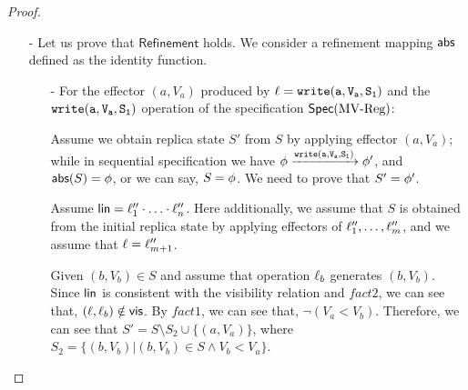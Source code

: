 \begin {proof}
\begin{itemize}
    \begin{itemize}
    \setlength{\itemsep}{0.5pt}
    \item[-] $(V < V_1) \vee (V < V_2)$,

    \item[-] $(b,V) = (a_1,V_1)$, $V_1 < V_2$, or there exists $(c,V_c) \in S$, such that $V_1 < V_c$,

    \item[-] $(b,V) = (a_2,V_2)$, $V_2 < V_1$, or there exists $(c,V_c) \in S$, such that $V_2 < V_c$.
    \end{itemize}


\item[-] Let us prove that $\mathsf{Refinement}$ holds. We consider a refinement mapping $\mathsf{abs}$ defined as the identity function.

    \begin{itemize}
    \setlength{\itemsep}{0.5pt}
    \item[-] For the effector $(a,V_a)$ produced by $\alabel = \alabelshort[{\tt write}]{a,V_a,S_1}$ and the $\alabelshort[{\tt write}]{a,V_a,S_1}$ operation of the specification $\mathsf{Spec}(\text{MV\text{-}Reg})$:


    Assume we obtain replica state $S'$ from $S$ by applying effector $(a,V_a)$; while in sequential specification we have $\abstate \xrightarrow{\alabelshort[{\tt write}]{a,V_a,S_1}} \abstate'$, and $\mathsf{abs}(S) = \phi$, or we can say, $S = \phi$. We need to prove that $S' = \phi'$.

    Assume $\mathsf{lin} = \ell''_1 \cdot \ldots \cdot \ell''_n$. Here additionally, we assume that $S$ is obtained from the initial replica state by applying effectors of $\ell''_1,\ldots,\ell''_m$, and we assume that $\ell = \ell''_{m+1}$.

    Given $(b,V_b) \in S$ and assume that operation $\ell_b$ generates $(b,V_b)$. Since $\mathsf{lin}$ is consistent with the visibility relation and $fact2$, we can see that, $(\ell,\ell_b) \notin \mathsf{vis}$. By $fact1$, we can see that, $\neg (V_a < V_b)$. Therefore, we can see that $S' = S \setminus S_2 \cup \{ (a,V_a) \}$, where $S_2 = \{ (b,V_b) \vert (b,V_b) \in S \wedge V_b < V_a \}$.



\end{itemize}
\end{itemize}
\end{proof}
